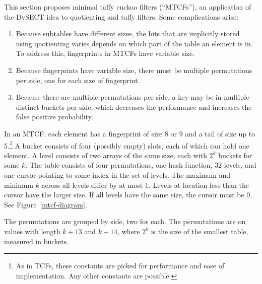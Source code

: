 \documentclass[letterpaper,twocolumn,10pt]{article}
\newcommand{\ints}{\mathbb{Z}}
\newcommand{\dotcup}{\ensuremath{\mathaccent\cdot\cup}}
\begin{document}
This section proposes minimal taffy cuckoo filters (``MTCFs''), an application of the DySECT idea to quotienting and taffy filters.
Some complications arise:

\begin{enumerate}
  \item Because subtables have different sizes, the bits that are implicitly stored using quotienting varies depends on which part of the table an element is in.
    To address this, fingerprints in MTCFs have variable size.
  \item Because fingerprints have variable size, there must be multiple permutations per side, one for each size of fingerprint.
  \item Because there are multiple permutations per side, a key may be in multiple distinct buckets per side, which decreases the performance and increases the false positive probability.
\end{enumerate}

In an MTCF, each element has a fingerprint of size 8 or 9 and a tail of size up to 5.\footnote{As in TCFs, these constants are picked for performance and ease of implementation.
Any other constants are possible.
}
A bucket consists of four (possibly empty) slots, each of which can hold one element.
A level consists of two arrays of the same size, each with $2^k$ buckets for some $k$.
The table consists of four permutations, one hash function, $32$ levels, and one cursor pointing to some index in the set of levels.
The maximum and minimum $k$ across all levels differ by at most 1.
Levels at location less than the cursor have the larger size.
If all levels have the same size, the cursor must be 0.
See %
Figure~\ref{mtcf-diagram}.

The permutations are grouped by side, two for each.
The permutations are on values with length $k + 13$ and $k + 14$, where $2^k$ is the size of the smallest table, measured in buckets.

\end{document}
